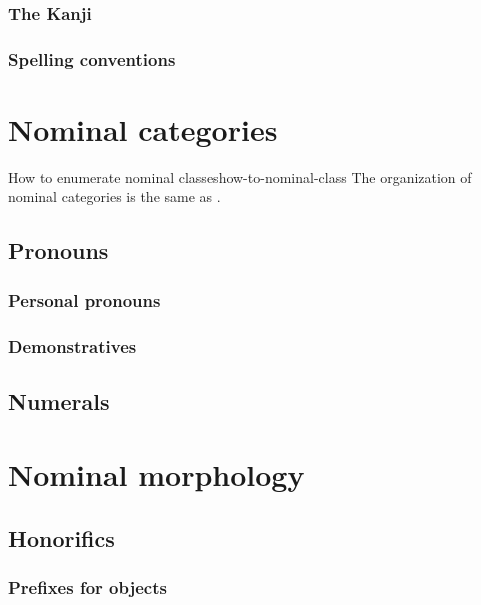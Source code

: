 \documentclass[UTF8, a4paper, oneside, scheme=plain]{ctexrep}
\newcommand*{\citechap}[1]{chap.~{#1}}
\begin{document}
\subsection{The Kanji}\label{sec:kanji}


\subsection{Spelling conventions}

\chapter{Nominal categories}

\begin{theorybox}{How to enumerate nominal classes}{how-to-nominal-class}
    The organization of nominal categories is the same as \citet[\citechap{3}, \citechap{4}]{Friesen2017}.
\end{theorybox}

\section{Pronouns}

\subsection{Personal pronouns}\label{sec:personal-pronoun}

\subsection{Demonstratives}

\section{Numerals}

\chapter{Nominal morphology}

\section{Honorifics}\label{sec:nominal-polite}

\subsection{Prefixes for objects}
\end{document}
